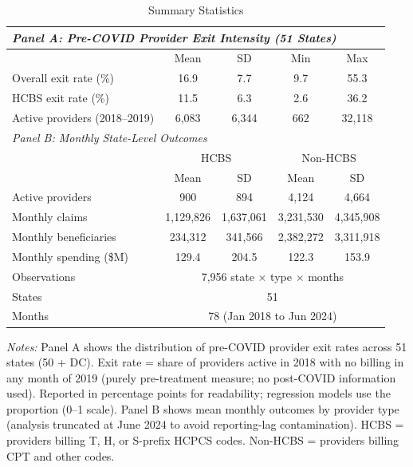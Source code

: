 \begin{table}[t]
\centering
\caption{Summary Statistics}
\label{tab:summary}
\begin{tabular}{lcccc}
\toprule
\multicolumn{5}{l}{\textit{Panel A: Pre-COVID Provider Exit Intensity (51 States)}} \\
\midrule
 & Mean & SD & Min & Max \\
Overall exit rate (\%) & 16.9 & 7.7 & 9.7 & 55.3 \\
HCBS exit rate (\%) & 11.5 & 6.3 & 2.6 & 36.2 \\
Active providers (2018--2019) & 6,083 & 6,344 & 662 & 32,118 \\
\midrule
\multicolumn{5}{l}{\textit{Panel B: Monthly State-Level Outcomes}} \\
\midrule
 & \multicolumn{2}{c}{HCBS} & \multicolumn{2}{c}{Non-HCBS} \\
 & Mean & SD & Mean & SD \\
Active providers & 900 & 894 & 4,124 & 4,664 \\
Monthly claims & 1,129,826 & 1,637,061 & 3,231,530 & 4,345,908 \\
Monthly beneficiaries & 234,312 & 341,566 & 2,382,272 & 3,311,918 \\
Monthly spending (\$M) & 129.4 & 204.5 & 122.3 & 153.9 \\
\midrule
Observations & \multicolumn{4}{c}{7,956 state $\times$ type $\times$ months} \\
States & \multicolumn{4}{c}{51} \\
Months & \multicolumn{4}{c}{78 (Jan 2018 to Jun 2024)} \\
\bottomrule
\end{tabular}
\begin{minipage}{0.95\textwidth}
\vspace{0.2cm}
\footnotesize \textit{Notes:} Panel A shows the distribution of pre-COVID provider exit rates across 51 states (50 + DC). Exit rate = share of providers active in 2018 with no billing in any month of 2019 (purely pre-treatment measure; no post-COVID information used). Reported in percentage points for readability; regression models use the proportion (0--1 scale). Panel B shows mean monthly outcomes by provider type (analysis truncated at June 2024 to avoid reporting-lag contamination). HCBS = providers billing T, H, or S-prefix HCPCS codes. Non-HCBS = providers billing CPT and other codes.
\end{minipage}
\end{table}
